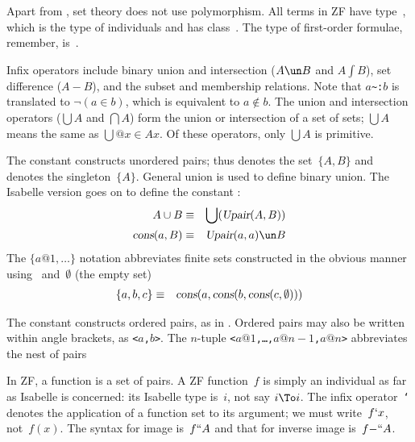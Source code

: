 Apart from , set theory does not use polymorphism.  All terms in
ZF have type~, which is the type of individuals and has
class~.  The type of first-order formulae, remember, 
is~.

Infix operators include binary union and intersection ($A\un B$ and
$A\int B$), set difference ($A-B$), and the subset and membership
relations.  Note that $a$\verb|~:|$b$ is translated to $\lnot(a\in b)$,
which is equivalent to  $a\notin b$.  The
union and intersection operators ($\bigcup A$ and $\bigcap A$) form the
union or intersection of a set of sets; $\bigcup A$ means the same as
$\bigcup@{x\in A}x$.  Of these operators, only $\bigcup A$ is primitive.

The constant  constructs unordered pairs; thus  denotes the set~$\{A,B\}$ and
 denotes the singleton~$\{A\}$.  General union is
used to define binary union.  The Isabelle version goes on to define
the constant
:
\begin{eqnarray*}
   A\cup B              & \equiv &       \bigcup(\isa{Upair}(A,B)) \\
   \isa{cons}(a,B)      & \equiv &        \isa{Upair}(a,a) \un B
\end{eqnarray*}
The $\{a@1, \ldots\}$ notation abbreviates finite sets constructed in the
obvious manner using~ and~$\emptyset$ (the empty set) \isasymin \begin{eqnarray*}
 \{a,b,c\} & \equiv & \emph{\sl cons}(a,\emph{\sl cons}(b,\emph{\sl cons}(c,\emptyset)))
\end{eqnarray*}

The constant  constructs ordered pairs, as in .  Ordered pairs may also be written within angle brackets,
as {\tt<$a$,$b$>}.  The $n$-tuple {\tt<$a@1$,\ldots,$a@{n-1}$,$a@n$>}
abbreviates the nest of pairs\par\nobreak
\centerline{}

In ZF, a function is a set of pairs.  A ZF function~$f$ is simply an
individual as far as Isabelle is concerned: its Isabelle type is~$i$, not say
$i\To i$.  The infix operator~{\tt`} denotes the application of a function set
to its argument; we must write~$f{\tt`}x$, not~$f(x)$.  The syntax for image
is~$f{\tt``}A$ and that for inverse image is~$f{\tt-``}A$.


